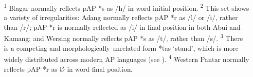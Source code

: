 \textsuperscript{1} Blagar normally reflects pAP *s as /h/ in word-initial position. 
\textsuperscript{2} This set shows a variety of irregularities: Adang normally reflects pAP *r as /l/ or /i/, rather than /r/; pAP *r is normally reflected as /i/ in final position in both Abui and Kamang; and Wersing normally reflects pAP *s as /t/, rather than /s/.
\textsuperscript{3} There is a competing and morphologically unrelated form *tas `stand', which is more widely distributed across modern AP languages (see \citealt{HoltonRobinsonTVhistory}).  
\textsuperscript{4} Western Pantar normally reflects pAP *r as {\O} in word-final position.  

